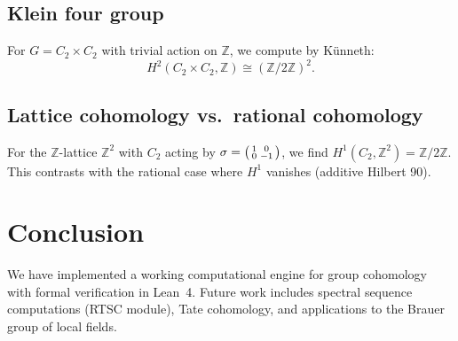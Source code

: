 \documentclass[11pt,a4paper]{article}
\theoremstyle{definition}
\theoremstyle{remark}
\begin{document}
\subsection{Klein four group}

For $G = C_2 \times C_2$ with trivial action on $\mathbb{Z}$,
we compute by K\"unneth:
\[
  H^2(C_2 \times C_2, \mathbb{Z}) \cong (\mathbb{Z}/2\mathbb{Z})^2.
\]

\subsection{Lattice cohomology vs.\ rational cohomology}

For the $\mathbb{Z}$-lattice $\mathbb{Z}^2$ with $C_2$ acting by
$\sigma = \begin{psmallmatrix} 1 & 0 \\ 0 & -1 \end{psmallmatrix}$,
we find $H^1(C_2, \mathbb{Z}^2) = \mathbb{Z}/2\mathbb{Z}$. This
contrasts with the rational case where $H^1$ vanishes (additive Hilbert 90).

\section{Conclusion}

We have implemented a working computational engine for group cohomology
with formal verification in Lean~4. Future work includes spectral
sequence computations (RTSC module), Tate cohomology, and applications
to the Brauer group of local fields.



\end{document}
